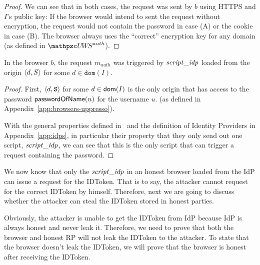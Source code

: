 \begin{proof}
    We can see that in both cases, the request was sent by $b$ 
    using HTTPS and $I$'s public key: If the browser would 
    intend to sent the request without encryption, the request 
    would not contain the password in case (A) or the cookie in 
    case (B). The browser always uses the ``correct'' encryption 
    key for any domain (as defined in $\uppressoauthwebsystem$).
  \end{proof}
  
  \begin{lemma}\label{lemma:script-idp-trigger-request} %
    In the browser $b$, the request $m_{auth}$ was triggered by $\mathit{script\_idp}$ 
    loaded from the origin $\langle {{}d, S} \rangle$ for some $d \in \mathtt{dom}(I)$.
  \end{lemma}
  \begin{proof}
    First, $\langle d,\mathtt{S}\rangle$ for some $d \in \mathsf{dom}(I)$ is the 
    only origin that has access to the password $\mathsf{passwordOfName}(u)$ for 
    the username $u$.
    (as defined in Appendix~\ref{app:browsers-uppresso}).
  
    With the general properties defined in~\cite{BrowserID} and the
    definition of Identity Providers in Appendix~\ref{app:idps}, in
    particular their property that they only send out one script,
    $\mathit{script\_idp}$, we can see that this is the only script that can
    trigger a request containing the password.
  \end{proof}

  \newc
  We now know that only the $\mathit{script\_idp}$ in an honest browser 
  loaded from the IdP can issue a request for the IDToken. 
  That is to say, the attacker cannot request for the correct IDToken 
  by himself. Therefore, next we are going to discuss whether the attacker
  can steal the IDToken stored in honest parties.

  Obviously, the attacker is unable to get the IDToken from IdP because IdP 
  is always honest and never leak it. Therefore, we need to prove that both 
  the browser and honest RP will not leak the IDToken to the attacker. 
  To state that the browser doesn't leak the IDToken, 
  we will prove that the browser is honest after receiving the IDToken.
  \oldc
  
